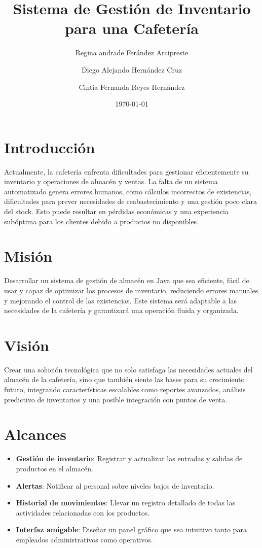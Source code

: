 \documentclass{article}
\title{Sistema de Gestión de Inventario para una Cafetería}
\author{Regina andrade Ferández Arcipreste\and Diego Alejando Hernández Cruz\and Cintia Fernanda Reyes Hernández  }
\date{\today}
\begin{document}
\maketitle

\section{Introducción}
Actualmente, la cafetería enfrenta dificultades para gestionar eficientemente su inventario y operaciones de almacén y ventas. La falta de un sistema automatizado genera errores humanos, como cálculos incorrectos de existencias, dificultades para prever necesidades de reabastecimiento y una gestión poco clara del stock. Esto puede resultar en pérdidas económicas y una experiencia subóptima para los clientes debido a productos no disponibles.

\section{Misión}
Desarrollar un sistema de gestión de almacén en Java que sea eficiente, fácil de usar y capaz de optimizar los procesos de inventario, reduciendo errores manuales y mejorando el control de las existencias. Este sistema será adaptable a las necesidades de la cafetería y garantizará una operación fluida y organizada.

\section{Visión}
Crear una solución tecnológica que no solo satisfaga las necesidades actuales del almacén de la cafetería, sino que también siente las bases para su crecimiento futuro, integrando características escalables como reportes avanzados, análisis predictivo de inventarios y una posible integración con puntos de venta.

\section{Alcances}
\begin{itemize}
\item \textbf{Gestión de inventario}: Registrar y actualizar las entradas y salidas de productos en el almacén.
\item \textbf{Alertas}: Notificar al personal sobre niveles bajos de inventario.
\item \textbf{Historial de movimientos}: Llevar un registro detallado de todas las actividades relacionadas con los productos.
\item \textbf{Interfaz amigable}: Diseñar un panel gráfico que sea intuitivo tanto para empleados administrativos como operativos.
\end{itemize}
\end{document}
